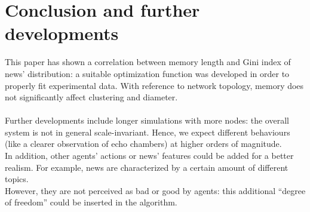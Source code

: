 \section{Conclusion and further developments}
This paper has shown a correlation between memory length and Gini index of news' distribution: 
a suitable optimization function was developed in order to properly fit experimental data.
With reference to network topology, memory does not significantly affect clustering and diameter.\\
\\
Further developments include longer simulations with more nodes:  the overall system is not in general 
scale-invariant. Hence, we expect different behaviours (like a clearer observation of echo chambers) at higher orders of magnitude.\\
In addition, other agents' actions or news' features could be added for a better realism.
For example, news are characterized by a certain amount of different topics.\\
However, they are not perceived as bad or good by agents: this additional ``degree of freedom'' 
could be inserted in the algorithm.






